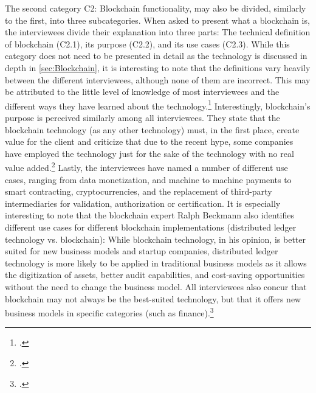 The second category C2: Blockchain functionality, may also be divided, similarly to the first, into three subcategories. When asked to present what a blockchain is, the interviewees divide their explanation into three parts: The technical definition of blockchain (C2.1), its purpose (C2.2), and its use cases (C2.3). While this category does not need to be presented in detail as the technology is discussed in depth in \ref{sec:Blockchain}, it is interesting to note that the definitions vary heavily between the different interviewees, although none of them are incorrect. This may be attributed to the little level of knowledge of most interviewees and the different ways they have learned about the technology.\footcites[Cf.][P3]{DanielKaltenbach_Interview}[cf.][P58]{BjoernPaulewicz_Interview}[cf.][P91]{RalphBeckmann_Interview} Interestingly, blockchain's purpose is perceived similarly among all interviewees. They state that the blockchain technology (as any other technology) must, in the first place, create value for the client and criticize that due to the recent hype, some companies have employed the technology just for the sake of the technology with no real value added.\footcites[Cf.][P23, P25, P26, P27]{DanielKaltenbach_Interview}[cf.][P69]{BjoernPaulewicz_Interview}[cf.][P92, P114, P117]{RalphBeckmann_Interview} Lastly, the interviewees have named a number of different use cases, ranging from data monetization, and machine to machine payments to smart contracting, cryptocurrencies, and the replacement of third-party intermediaries for validation, authorization or certification. It is especially interesting to note that the blockchain expert Ralph Beckmann also identifies different use cases for different blockchain implementations (distributed ledger technology vs. blockchain): While blockchain technology, in his opinion, is better suited for new business models and startup companies, distributed ledger technology is more likely to be applied in traditional business models as it allows the digitization of assets, better audit capabilities, and cost-saving opportunities without the need to change the business model. All interviewees also concur that blockchain may not always be the best-suited technology, but that it offers new business models in specific categories (such as finance).\footcites[Cf.][P14, P17]{DanielKaltenbach_Interview}[cf.][P57, P80, P77]{BjoernPaulewicz_Interview}[cf.][P103, P194, P105, P106, P107]{RalphBeckmann_Interview}

